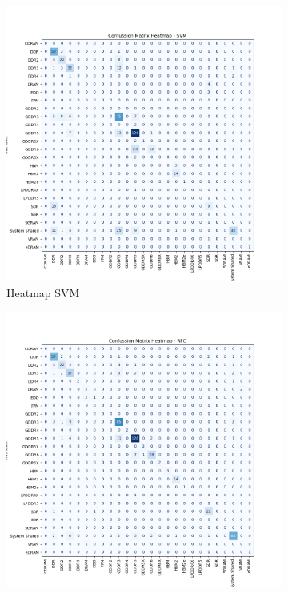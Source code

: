 \documentclass[conference]{IEEEtran}
\begin{document}
\begin{figure}[H]
	\centering
	\begin{subfigure}[b]{0.3\textwidth}
		\centering
		\includegraphics[width=1.3\textwidth]{CM_Heatmap_SVM.png}
		\caption{Heatmap SVM}
		\label{CM_Heatmap_SVM}
	\end{subfigure}
	\hfill
	\begin{subfigure}[b]{0.3\textwidth}
		\centering
		\includegraphics[width=1.3\textwidth]{CM_Heatmap_RFC.png}

\end{subfigure}
\end{figure}
\end{document}
